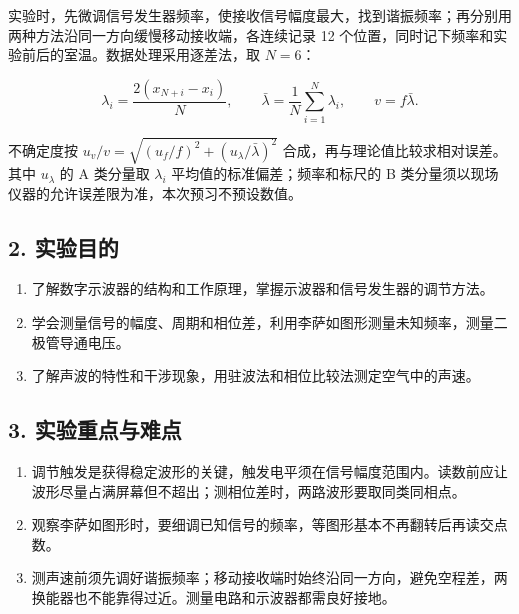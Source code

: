 实验时，先微调信号发生器频率，使接收信号幅度最大，找到谐振频率；再分别用两种方法沿同一方向缓慢移动接收端，各连续记录 12 个位置，同时记下频率和实验前后的室温。数据处理采用逐差法，取 $N=6$：

\[
\lambda_i=\frac{2(x_{N+i}-x_i)}{N},\qquad \bar\lambda=\frac1N\sum_{i=1}^{N}\lambda_i,\qquad v=f\bar\lambda.
\]

不确定度按 $u_v/v=\sqrt{(u_f/f)^2+(u_\lambda/\bar\lambda)^2}$ 合成，再与理论值比较求相对误差。其中 $u_\lambda$ 的 A 类分量取 $\lambda_i$ 平均值的标准偏差；频率和标尺的 B 类分量须以现场仪器的允许误差限为准，本次预习不预设数值。

\subsection*{2. 实验目的}

\begin{enumerate}
\item 了解数字示波器的结构和工作原理，掌握示波器和信号发生器的调节方法。
\item 学会测量信号的幅度、周期和相位差，利用李萨如图形测量未知频率，测量二极管导通电压。
\item 了解声波的特性和干涉现象，用驻波法和相位比较法测定空气中的声速。
\end{enumerate}

\subsection*{3. 实验重点与难点}

\begin{enumerate}
\item 调节触发是获得稳定波形的关键，触发电平须在信号幅度范围内。读数前应让波形尽量占满屏幕但不超出；测相位差时，两路波形要取同类同相点。
\item 观察李萨如图形时，要细调已知信号的频率，等图形基本不再翻转后再读交点数。
\item 测声速前须先调好谐振频率；移动接收端时始终沿同一方向，避免空程差，两换能器也不能靠得过近。测量电路和示波器都需良好接地。
\end{enumerate}
